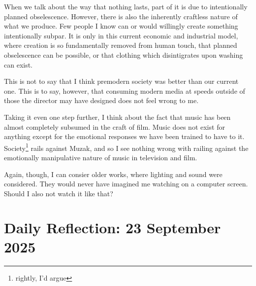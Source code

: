 \documentclass[12pt]{article}
\renewcommand{\,}{\textsuperscript{,}}
\begin{document}
When we talk about the way that nothing lasts, part of it is due to intentionally planned obselescence.
However, there is also the inherently craftless nature of what we produce.
Few people I know can or would willingly create something intentionally subpar.
It is only in this current economic and industrial model, where creation is so fundamentally removed from human touch, that planned obselescence can be possible, or that clothing which disintigrates upon washing can exist.

This is not to say that I think premodern society was better than our current one.
This is to say, however, that consuming modern media at speeds outside of those the director may have designed does not feel wrong to me.

Taking it even one step further, I think about the fact that music has been almost completely subsumed in the craft of film.
Music does not exist for anything except for the emotional responses we have been trained to have to it.
Society\footnote{rightly, I'd argue} rails against Muzak, and so I see nothing wrong with railing against the emotionally manipulative nature of music in television and film.

Again, though, I can consier older works, where lighting and sound were considered.
They would never have imagined me watching on a computer screen.
Should I also not watch it like that?


\section{Daily Reflection: 23 September 2025}
\end{document}
